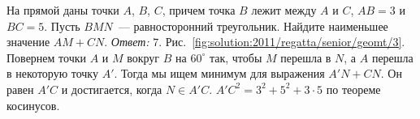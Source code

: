 \problem
На прямой даны точки $A$, $B$, $C$, причем точка $B$ лежит между $A$ и $C$, $AB = 3$ и $BC = 5$.
Пусть $BMN$~--- равносторонний треугольник.
Найдите наименьшее значение $AM + CN$.
%
\label{solution:2011/regatta/senior/geomt/3}%
\emph{Ответ:} $7$.
Рис.~\ref{fig:solution:2011/regatta/senior/geomt/3}.
Повернем точки $A$ и $M$ вокруг $B$ на $60^\circ$ так, чтобы $M$ перешла в $N$,
а $A$ перешла в некоторую точку $A'$.
Тогда мы ищем минимум для выражения $A'N + CN$.
Он равен $A'C$ и достигается, когда $N \in A'C$.
$A'C^2 = 3^2 + 5^2 + 3 \cdot 5$ по теореме косинусов.
\endproblem
